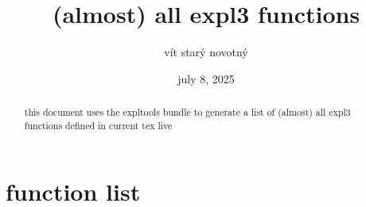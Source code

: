 \documentclass{article}
\title{(almost) all expl3 functions}
\author{vít starý novotný}
\date{july 8, 2025}
\begin{document}
\maketitle
\begin{abstract}
this document uses the expltools bundle to generate a list of (almost) all
expl3 functions defined in current tex live
\end{abstract}
\tableofcontents
\section{function list}

\printindex[functions]
\printindex[files]
\end{document}
